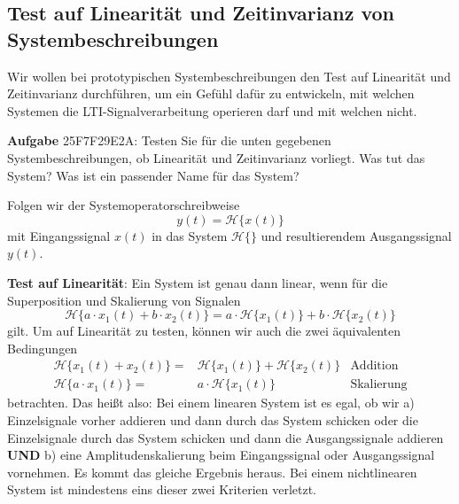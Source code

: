 \documentclass[11pt,a4paper,DIV=12]{scrartcl}
\numberwithin{equation}{section}
\numberwithin{figure}{section}
\newcommand{\sysH}[1]{\mathcal{H}{\{#1\}}}
\begin{document}
\clearpage
\subsection{Test auf Linearität und Zeitinvarianz von Systembeschreibungen}
\label{sec:25F7F29E2A}
\begin{Ziel}
Wir wollen bei prototypischen Systembeschreibungen den Test auf
Linearität und Zeitinvarianz durchführen, um ein Gefühl dafür zu entwickeln,
mit welchen Systemen die LTI-Signalverarbeitung operieren darf und mit welchen nicht.
\end{Ziel}
\textbf{Aufgabe} {\tiny 25F7F29E2A}: Testen Sie für die unten gegebenen
Systembeschreibungen, ob Linearität und Zeitinvarianz vorliegt.
Was tut das System? Was ist ein passender Name für das System?
\begin{Werkzeug}
Folgen wir der Systemoperatorschreibweise
\begin{equation}
y(t) = \sysH{x(t)}
\end{equation}
mit Eingangssignal $x(t)$ in das System $\sysH{}$ und resultierendem
Ausgangssignal $y(t)$.

\textbf{Test auf Linearität}:
%
Ein System ist genau dann linear, wenn für die Superposition und Skalierung
von Signalen
\begin{equation}
\sysH{a\cdot x_1(t) + b\cdot x_2(t)} = a\cdot\sysH{x_1(t)} + b\cdot\sysH{x_2(t)}
\end{equation}
gilt.
Um auf Linearität zu testen, können wir auch die zwei äquivalenten Bedingungen
\begin{align}
\sysH{x_1(t) + x_2(t)} =& \sysH{x_1(t)} + \sysH{x_2(t)} &\text{Addition}\\
\sysH{a \cdot x_1(t)} =& a \cdot \sysH{x_1(t)} &\text{Skalierung}
\end{align}
betrachten.
Das heißt also: Bei einem linearen System ist es egal, ob wir a) Einzelsignale
vorher addieren und dann durch das System schicken oder die Einzelsignale durch das
System schicken und dann die Ausgangssignale addieren \textbf{UND} b)
eine Amplitudenskalierung beim Eingangssignal oder Ausgangssignal vornehmen. Es kommt
das gleiche Ergebnis heraus. Bei einem nichtlinearen System ist mindestens eins dieser
zwei Kriterien verletzt.


\end{Werkzeug}
\end{document}
